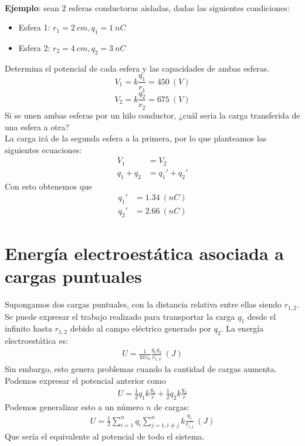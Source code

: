 \documentclass{./FisicaII.tex}
\begin{document}
\\
\textbf{Ejemplo}: sean 2 esferas conductoras aisladas, dadas las siguientes condiciones:
\begin{itemize}
	\item Esfera 1: $r_1 = 2~cm, q_1 = 1~nC$ 
	\item Esfera 2: $r_2 = 4~cm, q_2=3~nC$ 
\end{itemize}
Determina el potencial de cada esfera y las capacidades de ambas esferas.
\[
	V_1 = k \frac{q_1}{r_1} = 450~(V)
\]
\[
	V_2 = k \frac{q_2}{r_2} = 675~(V)
\]
Si se unen ambas esferas por un hilo conductor, ¿cuál seria la carga transferida de una esfera a otra?\\
La carga irá de la segunda esfera a la primera, por lo que planteamos las siguientes ecuaciones:
\begin{equation}
	\begin{split}
		V_1 &= V_2\\
		q_1+q_2 &= q_1'+q_2'
	\end{split}
\end{equation}
Con esto obtenemos que
\begin{equation}
	\begin{split}
		q_1' &= 1.34~(nC)\\
		q_2' &= 2.66~(nC)
	\end{split}
\end{equation}
\section{Energía electroestática asociada a cargas puntuales}
Supongamos dos cargas puntuales, con la distancia relativa entre ellas siendo $r_{1,2}$. Se puede expresar el trabajo realizado para transportar la carga $q_1$ desde el infinito hasta $r_{1,2}$ debido al campo eléctrico generado por $q_2$. La energía electroestática es:
\begin{equation}
	\begin{split}
		U = \frac{1}{4\pi\varepsilon_0} \frac{q_1q_2}{r_{1,2}}~(J)
	\end{split}
\end{equation}
Sin embargo, esto genera problemas cuando la cantidad de cargas aumenta. Podemos expresar el potencial anterior como
\begin{equation}
	\begin{split}
		U = \frac{1}{2}q_1 k \frac{q_2}{r} + \frac{1}{2} q_2 k \frac{q_2}{r}
	\end{split}
\end{equation}
Podemos generalizar esto a un número $n$ de cargas:
\begin{equation}
	\begin{split}
		U = \frac{1}{2} \sum_{i=1}^{n}q_{i} \sum_{j=1,i\neq j}^{n}k \frac{q_{j}}{r_{i,j}}~(J)
	\end{split}
\end{equation}
Que sería el equivalente al potencial de todo el sistema.
\end{document}

